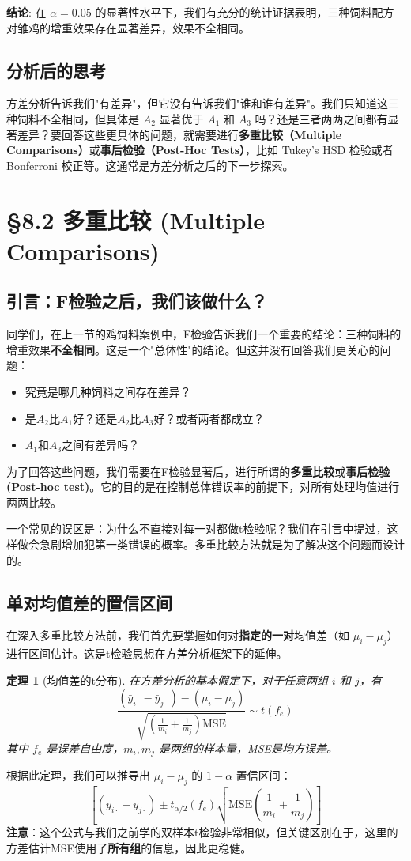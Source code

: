 \documentclass[12pt, a4paper]{amsart}
\newtheorem{theorem}{定理}
\begin{document}
\textbf{结论}:
在 $\alpha=0.05$ 的显著性水平下，我们有充分的统计证据表明，三种饲料配方对雏鸡的增重效果存在显著差异，效果不全相同。

\subsection{分析后的思考}
方差分析告诉我们"有差异"，但它没有告诉我们"谁和谁有差异"。我们只知道这三种饲料不全相同，但具体是 $A_2$ 显著优于 $A_1$ 和 $A_3$ 吗？还是三者两两之间都有显著差异？要回答这些更具体的问题，就需要进行\textbf{多重比较（Multiple Comparisons）}或\textbf{事后检验（Post-Hoc Tests）}，比如 Tukey's HSD 检验或者 Bonferroni 校正等。这通常是方差分析之后的下一步探索。

\section{§8.2 多重比较 (Multiple Comparisons)}
\subsection{引言：F检验之后，我们该做什么？}
同学们，在上一节的鸡饲料案例中，F检验告诉我们一个重要的结论：三种饲料的增重效果\textbf{不全相同}。这是一个"总体性"的结论。但这并没有回答我们更关心的问题：
\begin{itemize}
    \item 究竟是哪几种饲料之间存在差异？
    \item 是$A_2$比$A_1$好？还是$A_2$比$A_3$好？或者两者都成立？
    \item $A_1$和$A_3$之间有差异吗？
\end{itemize}
为了回答这些问题，我们需要在F检验显著后，进行所谓的\textbf{多重比较}或\textbf{事后检验 (Post-hoc test)}。它的目的是在控制总体错误率的前提下，对所有处理均值进行两两比较。

一个常见的误区是：为什么不直接对每一对都做t检验呢？我们在引言中提过，这样做会急剧增加犯第一类错误的概率。多重比较方法就是为了解决这个问题而设计的。

\subsection{单对均值差的置信区间}
在深入多重比较方法前，我们首先要掌握如何对\textbf{指定的一对}均值差（如 $\mu_i - \mu_j$）进行区间估计。这是t检验思想在方差分析框架下的延伸。


\begin{theorem}[均值差的t分布]
在方差分析的基本假定下，对于任意两组 $i$ 和 $j$，有
$$ \frac{(\bar{y}_{i\cdot} - \bar{y}_{j\cdot}) - (\mu_i - \mu_j)}{\sqrt{(\frac{1}{m_i} + \frac{1}{m_j})\text{MSE}}} \sim t(f_e) $$
其中 $f_e$ 是误差自由度，$m_i, m_j$ 是两组的样本量，MSE是均方误差。
\end{theorem}
根据此定理，我们可以推导出 $\mu_i - \mu_j$ 的 $1-\alpha$ 置信区间：
\begin{equation}
\left[ (\bar{y}_{i\cdot} - \bar{y}_{j\cdot}) \pm t_{\alpha/2}(f_e) \sqrt{\text{MSE}(\frac{1}{m_i} + \frac{1}{m_j})} \right]
\label{eq:ci_pair}
\end{equation}
\textbf{注意}：这个公式与我们之前学的双样本t检验非常相似，但关键区别在于，这里的方差估计MSE使用了\textbf{所有组}的信息，因此更稳健。
\end{document}
